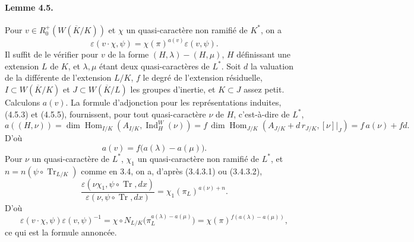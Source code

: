 \documentclass[10pt]{article}
\newcommand{\Hom}{\operatorname{Hom}}
\newcommand{\Ind}{\operatorname{Ind}}
\newcommand{\Tr}{\operatorname{Tr}}
\begin{document}
\paragraph{Lemme 4.5.} Pour \(v\in R^+_0(W(\overline K/K))\) et \(\chi\) un quasi-caractère non ramifié de \(K^*\), on a
\[
\varepsilon(v\cdot\chi,\psi)=\chi(\pi)^{a(v)}\varepsilon(v,\psi).
\]
Il suffit de le vérifier pour \(v\) de la forme \((H,\lambda)-(H,\mu)\), \(H\) définissant une extension \(L\) de \(K\), et \(\lambda,\mu\) étant deux quasi-caractères de \(L^*\). Soit \(d\) la valuation de la différente de l'extension \(L/K\), \(f\) le degré de l'extension résiduelle, \(I\subset W(\overline K/K)\) et \(J\subset W(\overline K/L)\) les groupes d'inertie, et \(K\subset J\) assez petit. Calculons \(a(v)\). La formule d'adjonction pour les représentations induites, (4.5.3) et (4.5.5), fournissent, pour tout quasi-caractère \(\nu\) de \(H\), c'est-à-dire de \(L^*\),
\[
\tag{4.5.1'}
a((H,\nu))
=\dim\Hom_{I/K}(A_{I/K},\Ind_H^W(\nu))
=f\,\dim\Hom_{J/K}(A_{J/K}+d\,r_{J/K},[\nu]|_J)
=f\,a(\nu)+fd.
\]
D'où
\[
a(v)=f\bigl(a(\lambda)-a(\mu)\bigr).
\]
Pour \(\nu\) un quasi-caractère de \(L^*\), \(\chi_1\) un quasi-caractère non ramifié de \(L^*\), et \(n=n(\psi\circ\Tr_{L/K})\) comme en 3.4, on a, d'après (3.4.3.1) ou (3.4.3.2),
\[
\frac{\varepsilon(\nu\chi_1,\psi\circ\Tr,dx)}
     {\varepsilon(\nu,\psi\circ\Tr,dx)}
=
\chi_1(\pi_L)^{a(\nu)+n}.
\]
D'où
\[
\varepsilon(v\cdot\chi,\psi)\varepsilon(v,\psi)^{-1}
=
\chi\circ N_{L/K}\bigl(\pi_L^{a(\lambda)-a(\mu)}\bigr)
=
\chi(\pi)^{f(a(\lambda)-a(\mu))},
\]
ce qui est la formule annoncée.
\end{document}
